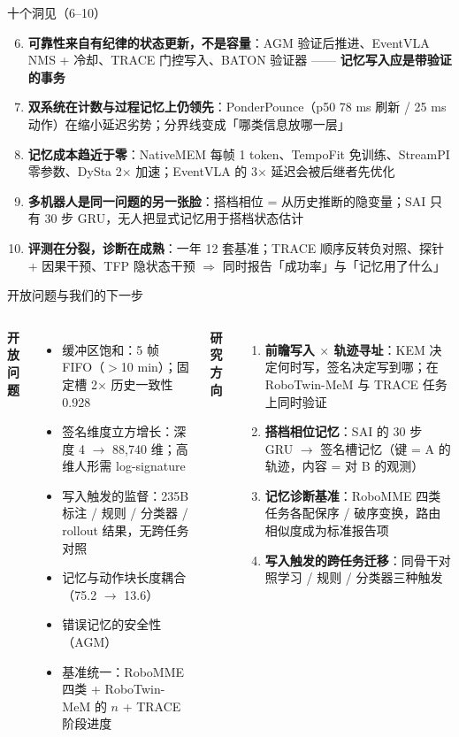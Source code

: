 \documentclass[aspectratio=169,10pt]{beamer}
\newcommand{\con}[1]{\textcolor{negative}{#1}}
\newcommand{\HL}[1]{\textcolor{emphasis}{\textbf{#1}}}
\begin{document}
\begin{frame}{十个洞见（6--10）}
\begin{enumerate}
\setcounter{enumi}{5}
\item \textbf{可靠性来自有纪律的状态更新，不是容量}：AGM 验证后推进、EventVLA NMS + 冷却、TRACE 门控写入、BATON 验证器 —— \HL{记忆写入应是带验证的事务}
\item \textbf{双系统在计数与过程记忆上仍领先}：PonderPounce（p50 78 ms 刷新 / 25 ms 动作）在缩小延迟劣势；分界线变成「哪类信息放哪一层」
\item \textbf{记忆成本趋近于零}：NativeMEM 每帧 1 token、TempoFit 免训练、StreamPI 零参数、DySta 2$\times$ 加速；EventVLA 的 3$\times$ 延迟会被后继者先优化
\item \textbf{多机器人是同一问题的另一张脸}：搭档相位 = 从历史推断的隐变量；SAI 只有 30 步 GRU，\con{无人}把显式记忆用于搭档状态估计
\item \textbf{评测在分裂，诊断在成熟}：一年 12 套基准；TRACE 顺序反转负对照、探针 + 因果干预、TFP 隐状态干预 $\Rightarrow$ 同时报告「成功率」与「记忆用了什么」
\end{enumerate}
\end{frame}

\begin{frame}{开放问题与我们的下一步}
\begin{columns}[T]
\textbf{开放问题}
\begin{itemize}
\item 缓冲区饱和：5 帧 FIFO（$>$10 min）；固定槽 2$\times$ 历史一致性 0.928
\item 签名维度立方增长：深度 4 $\to$ 88{,}740 维；高维人形需 log-signature
\item 写入触发的监督：235B 标注 / 规则 / 分类器 / rollout 结果，无跨任务对照
\item 记忆与动作块长度耦合（75.2 $\to$ 13.6）
\item 错误记忆的安全性（AGM）
\item 基准统一：RoboMME 四类 + RoboTwin-MeM 的 $n$ + TRACE 阶段进度
\end{itemize}
\textbf{研究方向}
\begin{enumerate}
\item \HL{前瞻写入 $\times$ 轨迹寻址}：KEM 决定何时写，签名决定写到哪；在 RoboTwin-MeM 与 TRACE 任务上同时验证
\item \HL{搭档相位记忆}：SAI 的 30 步 GRU $\to$ 签名槽记忆（键 = A 的轨迹，内容 = 对 B 的观测）
\item \HL{记忆诊断基准}：RoboMME 四类任务各配保序 / 破序变换，路由相似度成为标准报告项
\item \HL{写入触发的跨任务迁移}：同骨干对照学习 / 规则 / 分类器三种触发
\end{enumerate}
\end{columns}
\end{frame}
\end{document}
